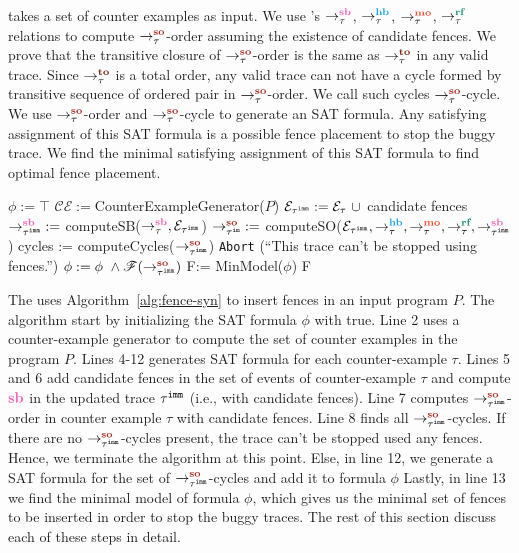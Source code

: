 \ourtechnique takes a set of counter examples as input.
We use \cc 's $\setSB$, $\setHB$, $\setMO$, $\setRF$ relations to compute 
$ \setSO $-order assuming the existence of candidate fences.
We prove that the transitive closure of $ \setSO $-order is the same as 
$ \setTO $ in any valid \cc trace. 
Since $ \setTO $ is a total order, any valid \cc trace can not have a 
cycle formed by transitive sequence of ordered pair in $ \setSO $-order. 
We call such cycles $\setSO$-cycle. 
We use $ \setSO $-order and $ \setSO $-cycle to generate an SAT formula. 
Any satisfying assignment of this SAT formula is a possible fence 
placement to stop the buggy trace. We find the minimal satisfying assignment of this SAT formula to find optimal fence placement. 

\begin{algorithm}
	\caption{\ourtechnique}
	\begin{algorithmic}[1]	
		\State $\phi := \top$
		\State $ \mathcal{CE} := $CounterExampleGenerator($P$)
		\Comment{$\tau$ = $ \langle \events_\tau, \setHB, \setMO, \setRF, \setSB  \rangle $}
			\State $ \events_{\imm{\tau}} := \events_\tau\ \union $ candidate fences
			\State $ \seqb{\imm{\tau}}{}{} := $ computeSB($\setSB, \events_{\imm{\tau}}$) \State $ \so{\tau^{\mathtt{im}}}{}{} := $ computeSO($\events_{\imm{\tau}}, \setHB, \setMO, \setRF, \seqb{\imm{\tau}}{}{}$)
			\State cycles := computeCycles($ \so{\imm{\tau}}{}{} $)
				\State \texttt{Abort} (``This trace can't be stopped using \cc fences.'')
				\State \Return
			\EndIf
			\State $\phi := \phi\ \^ \formula{\so{\imm{\tau}}{}{}} $ 
		\EndFor
		\State F:= MinModel($ \phi $)
		\State \Return F
%		
		\EndProcedure
		\label{alg:fence-syn}
	\end{algorithmic}
\end{algorithm}

The \ourtool uses Algorithm~\ref{alg:fence-syn} to insert fences in an 
input program $ P $. The algorithm start by initializing the 
SAT formula $ \phi $ with true.  Line 2 uses a counter-example generator 
to compute the set of counter examples in the program $ P $. 
Lines 4-12 generates SAT formula for each counter-example $ \tau $.
Lines 5 and 6 add candidate fences in the set of events of counter-example 
$ \tau $ and compute $ \lsb $ in the updated trace $ {\tau}^{\mathtt{imm}} $ (i.e., with candidate 
fences). 
Line 7 computes $ \so{\imm{\tau}}{}{} $-order in counter example $ \tau $ with candidate fences.
Line 8 finds all $ \so{\imm{\tau}}{}{} $-cycles. If there are no $ \so{\imm{\tau}}{}{} $-cycles 
present, the trace can't be stopped used any \cc fences. Hence, we 
terminate the algorithm at this point.
Else, in line 12, we generate a SAT formula for the set of $ \so{\imm{\tau}}{}{} $-cycles and add it to formula $ \phi $
Lastly, in line 13 we find the minimal model of formula $ \phi $, which 
gives us the minimal set of fences to be inserted in order to stop the 
buggy traces.
The rest of this section discuss each of these steps in detail.

